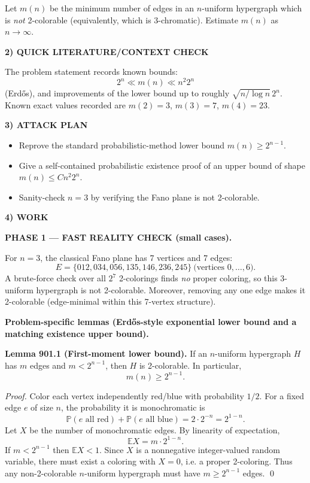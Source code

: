 Let $m(n)$ be the minimum number of edges in an $n$-uniform hypergraph which is
\emph{not} 2-colorable (equivalently, which is 3-chromatic).
Estimate $m(n)$ as $n\to\infty$.

\medskip
\noindent\textbf{2) QUICK LITERATURE/CONTEXT CHECK}

The problem statement records known bounds:
\[2^n\ll m(n)\ll n^2 2^n\]
(Erd\H{o}s), and improvements of the lower bound up to roughly
$\sqrt{n/\log n}\,2^n$.
Known exact values recorded are $m(2)=3$, $m(3)=7$, $m(4)=23$.

\medskip
\noindent\textbf{3) ATTACK PLAN}

\begin{itemize}
\item Reprove the standard probabilistic-method lower bound $m(n)\ge 2^{n-1}$.
\item Give a self-contained probabilistic existence proof of an upper bound of
shape $m(n)\le C n^2 2^n$.
\item Sanity-check $n=3$ by verifying the Fano plane is not 2-colorable.
\end{itemize}

\medskip
\noindent\textbf{4) WORK}

\textbf{PHASE 1 — FAST REALITY CHECK (small cases).}

For $n=3$, the classical Fano plane has 7 vertices and 7 edges:
\[
E=\{012,034,056,135,146,236,245\}\ \text{(vertices }0,\dots,6\text{).}
\]
A brute-force check over all $2^7$ 2-colorings finds \emph{no} proper coloring,
so this 3-uniform hypergraph is not 2-colorable.
Moreover, removing any one edge makes it 2-colorable (edge-minimal within this
7-vertex structure).

\medskip
\textbf{Problem-specific lemmas (Erd\H{o}s-style exponential lower bound and a
matching existence upper bound).}

\medskip
\noindent\textbf{Lemma 901.1 (First-moment lower bound).}
If an $n$-uniform hypergraph $H$ has $m$ edges and $m<2^{n-1}$, then $H$ is
2-colorable. In particular,
\[ m(n)\ge 2^{n-1}. \]

\emph{Proof.}
Color each vertex independently red/blue with probability $1/2$.
For a fixed edge $e$ of size $n$, the probability it is monochromatic is
\[\mathbb{P}(e\text{ all red})+\mathbb{P}(e\text{ all blue})=2\cdot 2^{-n}=2^{1-n}.
\]
Let $X$ be the number of monochromatic edges. By linearity of expectation,
\[ \mathbb{E}X = m\cdot 2^{1-n}. \]
If $m<2^{n-1}$ then $\mathbb{E}X<1$. Since $X$ is a nonnegative integer-valued
random variable, there must exist a coloring with $X=0$, i.e. a proper 2-coloring.
Thus any non-2-colorable $n$-uniform hypergraph must have $m\ge 2^{n-1}$ edges.
\qed

